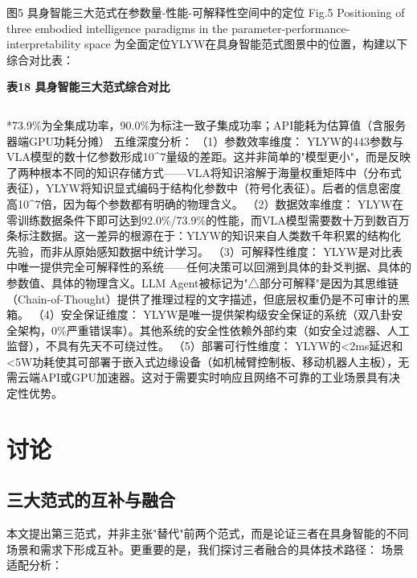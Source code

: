 \documentclass[12pt,a4paper]{article}
\begin{document}
图5  具身智能三大范式在参数量-性能-可解释性空间中的定位
Fig.5  Positioning of three embodied intelligence paradigms in the parameter-performance-interpretability space
为全面定位YLYW在具身智能范式图景中的位置，构建以下综合对比表：

\begin{center}
\textbf{表18  具身智能三大范式综合对比}
\begin{tabular}{lcccc}
\hline
\end{tabular}
\end{center}
*73.9\%为全集成功率，90.0\%为标注一致子集成功率；API能耗为估算值（含服务器端GPU功耗分摊）
五维深度分析：
（1）参数效率维度： YLYW的443参数与VLA模型的数十亿参数形成10^7量级的差距。这并非简单的"模型更小"，而是反映了两种根本不同的知识存储方式——VLA将知识溶解于海量权重矩阵中（分布式表征），YLYW将知识显式编码于结构化参数中（符号化表征）。后者的信息密度高10^7倍，因为每个参数都有明确的物理含义。
（2）数据效率维度： YLYW在零训练数据条件下即可达到92.0\%/73.9\%的性能，而VLA模型需要数十万到数百万条标注数据。这一差异的根源在于：YLYW的知识来自人类数千年积累的结构化先验，而非从原始感知数据中统计学习。
（3）可解释性维度： YLYW是对比表中唯一提供完全可解释性的系统——任何决策可以回溯到具体的卦爻判据、具体的参数值、具体的物理含义。LLM Agent被标记为"△部分可解释"是因为其思维链（Chain-of-Thought）提供了推理过程的文字描述，但底层权重仍是不可审计的黑箱。
（4）安全保证维度： YLYW是唯一提供架构级安全保证的系统（双八卦安全架构，0\%严重错误率）。其他系统的安全性依赖外部约束（如安全过滤器、人工监督），不具有先天不可绕过性。
（5）部署可行性维度： YLYW的<2ms延迟和<5W功耗使其可部署于嵌入式边缘设备（如机械臂控制板、移动机器人主板），无需云端API或GPU加速器。这对于需要实时响应且网络不可靠的工业场景具有决定性优势。

\section{讨论}

\subsection{三大范式的互补与融合}
本文提出第三范式，并非主张"替代"前两个范式，而是论证三者在具身智能的不同场景和需求下形成互补。更重要的是，我们探讨三者融合的具体技术路径：
场景适配分析：
\end{document}
